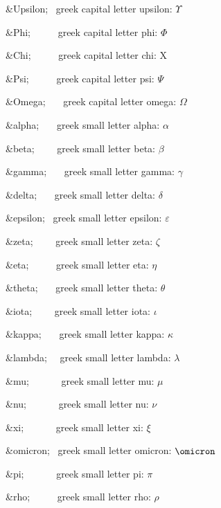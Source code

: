 \begin{DoxyItemize}
\item {\ttfamily \&Upsilon;}{\ttfamily ~} greek capital letter upsilon\+: {$\Upsilon$} 
\item {\ttfamily \&Phi;}{\ttfamily ~~~~~} greek capital letter phi\+: {$\Phi$} 
\item {\ttfamily \&Chi;}{\ttfamily ~~~~~} greek capital letter chi\+: X 
\item {\ttfamily \&Psi;}{\ttfamily ~~~~~} greek capital letter psi\+: {$\Psi$} 
\item {\ttfamily \&Omega;}{\ttfamily ~~~} greek capital letter omega\+: {$\Omega$} 
\item {\ttfamily \&alpha;}{\ttfamily ~~~} greek small letter alpha\+: {$\alpha$} 
\item {\ttfamily \&beta;}{\ttfamily ~~~~} greek small letter beta\+: {$\beta$} 
\item {\ttfamily \&gamma;}{\ttfamily ~~~} greek small letter gamma\+: {$\gamma$} 
\item {\ttfamily \&delta;}{\ttfamily ~~~} greek small letter delta\+: {$\delta$} 
\item {\ttfamily \&epsilon;}{\ttfamily ~} greek small letter epsilon\+: {$\varepsilon$} 
\item {\ttfamily \&zeta;}{\ttfamily ~~~~} greek small letter zeta\+: {$\zeta$} 
\item {\ttfamily \&eta;}{\ttfamily ~~~~~} greek small letter eta\+: {$\eta$} 
\item {\ttfamily \&theta;}{\ttfamily ~~~} greek small letter theta\+: {$\theta$} 
\item {\ttfamily \&iota;}{\ttfamily ~~~~} greek small letter iota\+: {$\iota$} 
\item {\ttfamily \&kappa;}{\ttfamily ~~~} greek small letter kappa\+: {$\kappa$} 
\item {\ttfamily \&lambda;}{\ttfamily ~~} greek small letter lambda\+: {$\lambda$} 
\item {\ttfamily \&mu;}{\ttfamily ~~~~~~} greek small letter mu\+: {$\mu$} 
\item {\ttfamily \&nu;}{\ttfamily ~~~~~~} greek small letter nu\+: {$\nu$} 
\item {\ttfamily \&xi;}{\ttfamily ~~~~~~} greek small letter xi\+: {$\xi$} 
\item {\ttfamily \&omicron;}{\ttfamily ~} greek small letter omicron\+: {$\omicron$} 
\item {\ttfamily \&pi;}{\ttfamily ~~~~~~} greek small letter pi\+: {$\pi$} 
\item {\ttfamily \&rho;}{\ttfamily ~~~~~} greek small letter rho\+: {$\rho$} 

\end{DoxyItemize}
